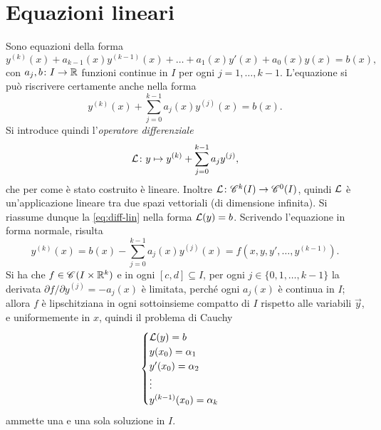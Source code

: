 \section{Equazioni lineari}
Sono equazioni della forma
\begin{equation}
y^{(k)}(x)+a_{k-1}(x)y^{(k-1)}(x)+\dots+a_1(x)y'(x)+a_0(x)y(x)=b(x),
\end{equation}
con $a_j,b\colon I\to\R$ funzioni continue in $I$ per ogni $j=1,\dots,k-1$. L'equazione si può riscrivere certamente anche nella forma
\begin{equation} \label{eq:diff-lin}
y^{(k)}(x)+\sum_{j=0}^{k-1}a_j(x)y^{(j)}(x)=b(x).
\end{equation}
Si introduce quindi l'\emph{operatore differenziale}
\begin{equation} \label{eq:L}
\lin\colon y\mapsto y^{(k)}+\sum_{j=0}^{k-1}a_jy^{(j)},
\end{equation}
che per come è stato costruito è lineare. Inoltre $\lin\colon\cont[k]{I}\to\cont[0]{I}$, quindi $\lin$ è un'applicazione lineare tra due spazi vettoriali (di dimensione infinita). Si riassume dunque la \eqref{eq:diff-lin} nella forma $\lin(y)=b$.
Scrivendo l'equazione in forma normale, risulta
\[
y^{(k)}(x)=b(x)-\sum_{j=0}^{k-1}a_j(x)y^{(j)}(x)=f(x,y,y',\dots,y^{(k-1)}).
\]
Si ha che $f\in\cont{I\times\R^k}$ e in ogni $[c,d]\subseteq I$, per ogni $j\in\{0,1,\dots,k-1\}$ la derivata $\partial f/\partial y^{(j)}=-a_j(x)$ è limitata, perché ogni $a_j(x)$ è continua in $I$; allora $f$ è lipschitziana in ogni sottoinsieme compatto di $I$ rispetto alle variabili $\vec y$, e uniformemente in $x$, quindi il problema di Cauchy
\begin{equation} \label{pcL}
\begin{cases}
\lin(y)=b\\
y(x_0)=\alpha_1\\
y'(x_0)=\alpha_2\\
\vdots\\
y^{(k-1)}(x_0)=\alpha_k
\end{cases}
\end{equation}
ammette una e una sola soluzione in $I$.


